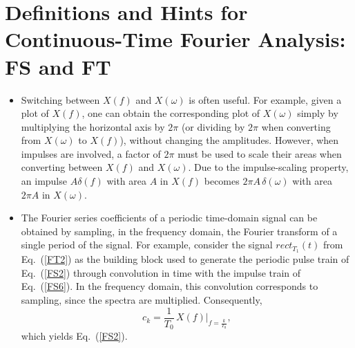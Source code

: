 \documentclass{article}
\newcommand{\aw}{\omega} %
\begin{document}
\section{Definitions and Hints for Continuous-Time Fourier Analysis: FS and FT}
\begin{itemize}

\item Switching between $X(f)$ and $X(\aw)$ is often useful. For example, given a plot of $X(f)$, one can obtain the corresponding plot of $X(\aw)$ simply by multiplying the horizontal axis by $2\pi$ (or dividing by $2\pi$ when converting from $X(\aw)$ to $X(f)$), without changing the amplitudes. However, when impulses are involved, a factor of $2\pi$ must be used to scale their areas when converting between $X(f)$ and $X(\aw)$. Due to the impulse-scaling property, an impulse $A\delta(f)$ with area $A$ in $X(f)$ becomes $2\pi A\,\delta(\aw)$ with area $2\pi A$ in $X(\aw)$.

\item The Fourier series coefficients of a periodic time-domain signal can be obtained by sampling, in the frequency domain, the Fourier transform of a single period of the signal. For example, consider the signal $rect_{T_1}(t)$ from Eq.~(\ref{FT2}) as the building block used to generate the periodic pulse train of Eq.~(\ref{FS2}) through convolution in time with the impulse train of Eq.~(\ref{FS6}). In the frequency domain, this convolution corresponds to sampling, since the spectra are multiplied. Consequently,
\[
c_k = \frac{1}{T_0}\,X(f)\bigg|_{f=\frac{k}{T_0}},
\]
which yields Eq.~(\ref{FS2}).

\end{itemize}
\end{document}
